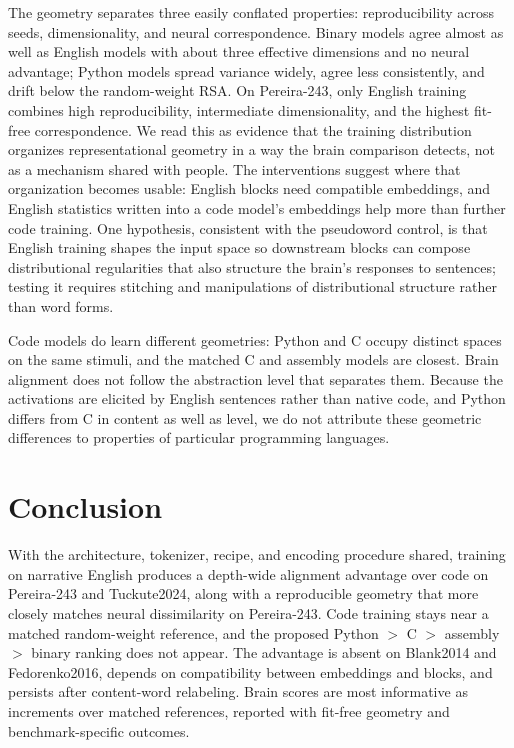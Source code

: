\documentclass[mlmain]{jmlr}
\begin{document}
The geometry separates three easily conflated properties: reproducibility across seeds, dimensionality, and neural correspondence. Binary models agree almost as well as English models with about three effective dimensions and no neural advantage; Python models spread variance widely, agree less consistently, and drift below the random-weight RSA. On Pereira-243, only English training combines high reproducibility, intermediate dimensionality, and the highest fit-free correspondence. We read this as evidence that the training distribution organizes representational geometry in a way the brain comparison detects, not as a mechanism shared with people. The interventions suggest where that organization becomes usable: English blocks need compatible embeddings, and English statistics written into a code model's embeddings help more than further code training. One hypothesis, consistent with the pseudoword control, is that English training shapes the input space so downstream blocks can compose distributional regularities that also structure the brain's responses to sentences; testing it requires stitching and manipulations of distributional structure rather than word forms.

Code models do learn different geometries: Python and C occupy distinct spaces on the same stimuli, and the matched C and assembly models are closest. Brain alignment does not follow the abstraction level that separates them. Because the activations are elicited by English sentences rather than native code, and Python differs from C in content as well as level, we do not attribute these geometric differences to properties of particular programming languages.

\section{Conclusion}
\label{sec:conclusion}

With the architecture, tokenizer, recipe, and encoding procedure shared, training on narrative English produces a depth-wide alignment advantage over code on Pereira-243 and Tuckute2024, along with a reproducible geometry that more closely matches neural dissimilarity on Pereira-243. Code training stays near a matched random-weight reference, and the proposed Python $>$ C $>$ assembly $>$ binary ranking does not appear. The advantage is absent on Blank2014 and Fedorenko2016, depends on compatibility between embeddings and blocks, and persists after content-word relabeling. Brain scores are most informative as increments over matched references, reported with fit-free geometry and benchmark-specific outcomes.
\end{document}
